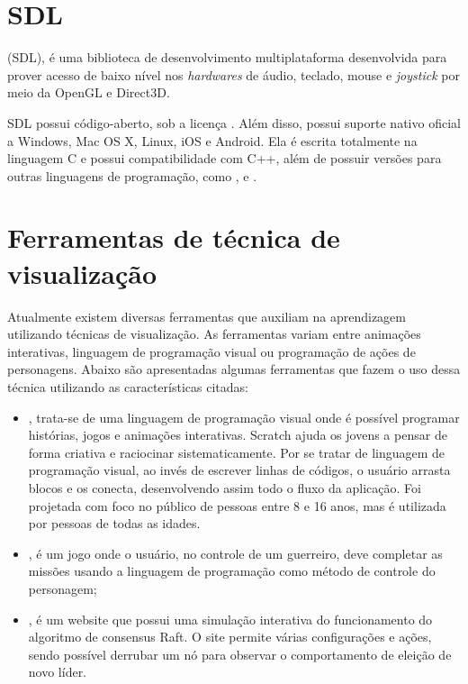 \documentclass[12pt, %
openright,
oneside, %
a4paper,    %
brazil]{facom-ufu-abntex2}
\begin{document}
\section{SDL}
 (SDL), é uma biblioteca de desenvolvimento multiplataforma desenvolvida para prover acesso de baixo nível nos \textit{hardwares} de áudio, teclado, mouse e \textit{joystick} por meio da OpenGL e Direct3D.

SDL possui código-aberto, sob a licença . Além disso, possui suporte nativo oficial a Windows, Mac OS X, Linux, iOS e Android. Ela é escrita totalmente na linguagem C e possui compatibilidade com C++, além de possuir versões para outras linguagens de programação, como ,  e .

\section{Ferramentas de técnica de visualização}
Atualmente existem diversas ferramentas que auxiliam na aprendizagem utilizando técnicas de visualização. As ferramentas variam entre animações interativas, linguagem de programação visual ou programação de ações de personagens. Abaixo são apresentadas algumas ferramentas que fazem o uso dessa técnica utilizando as características citadas:

\begin{itemize}

    \item {}, trata-se de uma linguagem de programação visual onde é possível programar histórias, jogos e animações interativas. Scratch ajuda os jovens a pensar de forma criativa e raciocinar sistematicamente. Por se tratar de linguagem de programação visual, ao invés de escrever linhas de códigos, o usuário arrasta blocos e os conecta, desenvolvendo assim todo o fluxo da aplicação. Foi projetada com foco no público de pessoas entre 8 e 16 anos, mas é utilizada por pessoas de todas as idades.

    \item {}, é um jogo onde o usuário, no controle de um guerreiro, deve completar as missões usando a linguagem de programação  como método de controle do personagem;

    \item {}, é um website que possui uma simulação interativa do funcionamento do algoritmo de consensus Raft. O site permite várias configurações e ações, sendo possível derrubar um nó para observar o comportamento de eleição de novo líder.

\end{itemize}
\end{document}
